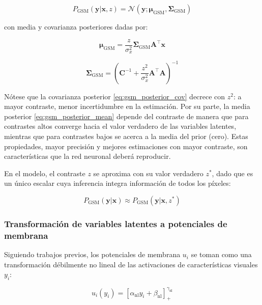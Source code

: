 \begin{equation}
P_{\text{GSM}}(\mathbf{y}|\mathbf{x}, z) = \mathcal{N}(\mathbf{y}; \boldsymbol{\mu}_{\text{GSM}}, \boldsymbol{\Sigma}_{\text{GSM}})
\label{eq:gsm_posterior}
\end{equation}

con media y covarianza posteriores dadas por:

\begin{equation}
\boldsymbol{\mu}_{\text{GSM}} = \frac{z}{\sigma_x^2} \boldsymbol{\Sigma}_{\text{GSM}} \mathbf{A}^\top \mathbf{x}
\label{eq:gsm_posterior_mean}
\end{equation}

\begin{equation}
\boldsymbol{\Sigma}_{\text{GSM}} = \left( \mathbf{C}^{-1} + \frac{z^2}{\sigma_x^2} \mathbf{A}^\top \mathbf{A} \right)^{-1}
\label{eq:gsm_posterior_cov}
\end{equation}

Nótese que la covarianza posterior \eqref{eq:gsm_posterior_cov} decrece con $z^2$: a mayor contraste, menor incertidumbre en la estimación. Por su parte, la media posterior \eqref{eq:gsm_posterior_mean} depende del contraste de manera que para contrastes altos converge hacia el valor verdadero de las variables latentes, mientras que para contrastes bajos se acerca a la media del prior (cero). Estas propiedades, mayor precisión y mejores estimaciones con mayor contraste, son características que la red neuronal deberá reproducir.

En el modelo, el contraste $z$ se aproxima con su valor verdadero $z^*$, dado que es un único escalar cuya inferencia integra información de todos los píxeles:

\begin{equation}
P_{\text{GSM}}(\mathbf{y}|\mathbf{x}) \approx P_{\text{GSM}}(\mathbf{y}|\mathbf{x}, z^*)
\label{eq:gsm_marginal}
\end{equation}


\subsubsection{Transformación de variables latentes a potenciales de membrana}

Siguiendo trabajos previos, los potenciales de membrana $u_i$ se toman como una transformación débilmente no lineal de las activaciones de características visuales $y_i$:

\begin{equation}
u_i(y_i) = \left[ \alpha_{\text{nl}} y_i + \beta_{\text{nl}} \right]_+^{\gamma_{\text{nl}}}
\label{eq:latent_to_membrane}
\end{equation}


